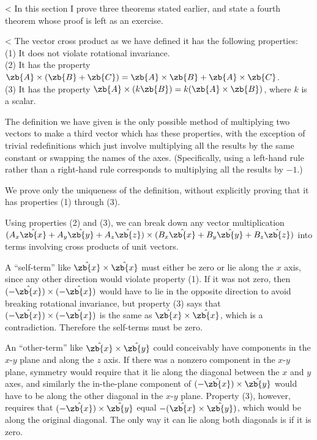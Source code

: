 <%
In this section I prove three theorems stated earlier,
and state a fourth theorem whose proof is left as an exercise.

<%
The vector cross product as we have defined it has the
following properties:\\
(1) It does not violate rotational invariance.\\
(2) It has the property $\zb{A}\times(\zb{B}+\zb{C})=\zb{A}\times\zb{B}+\zb{A}\times\zb{C}$.\\
(3) It has the property $\zb{A}\times(k\zb{B})=k(\zb{A}\times\zb{B})$, where $k$ is a scalar.


 The definition we have given is the only possible method of
multiplying two vectors to make a third vector which has
these properties, with the exception of trivial
redefinitions which just involve multiplying all the results
by the same constant or swapping the names of the axes.
(Specifically, using a left-hand rule rather than a
right-hand rule corresponds to multiplying all the results
by $-1$.)

 We prove only the uniqueness of the definition, without
explicitly proving that it has properties (1) through (3).

Using properties (2) and (3), we can break down any vector
multiplication
$(A_x\hat{\zb{x}}+A_y\hat{\zb{y}}+A_z\hat{\zb{z}})
\times(B_x\hat{\zb{x}}+B_y\hat{\zb{y}}+B_z\hat{\zb{z}})$ into terms involving
cross products of unit vectors.

A ``self-term'' like $\hat{\zb{x}}\times\hat{\zb{x}}$ must either be zero or lie along the $x$
axis, since any other direction would violate property (1).
If it was not zero, then
$(-\hat{\zb{x}})\times(-\hat{\zb{x}})$
 would have to lie in the opposite direction to avoid
breaking rotational invariance, but property (3) says that 
$(-\hat{\zb{x}})\times(-\hat{\zb{x}})$ is the
same as $\hat{\zb{x}}\times\hat{\zb{x}}$, which is a contradiction.
Therefore the self-terms
must be zero.

An ``other-term'' like $\hat{\zb{x}}\times\hat{\zb{y}}$ could conceivably have components in
the $x$-$y$ plane and along the $z$ axis. If there was a nonzero
component in the $x$-$y$ plane, symmetry would require that it
lie along the diagonal between the $x$ and $y$ axes, and
similarly the in-the-plane component of $(-\hat{\zb{x}})\times\hat{\zb{y}}$  would have to
be along the other diagonal in the $x$-$y$ plane. Property (3),
however, requires that $(-\hat{\zb{x}})\times\hat{\zb{y}}$ equal
$-(\hat{\zb{x}}\times\hat{\zb{y}})$, which would be along
the original diagonal. The only way it can lie along both
diagonals is if it is zero.

